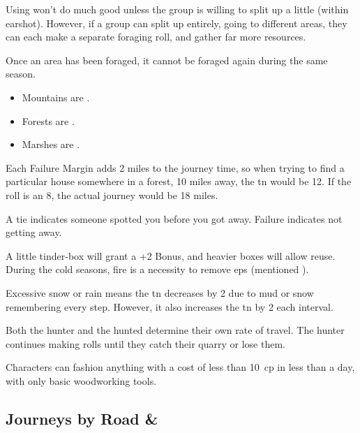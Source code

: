 \begin{multicols}{2}
Using  won't do much good unless the group is willing to split up a little (within earshot).
However, if a group can split up entirely, going to different areas, they can each make a separate foraging roll, and gather far more resources.

Once an area has been foraged, it cannot be foraged again during the same season.


\begin{itemize}
  \item
    Mountains are \tn[8].
  \item
    Forests are \tn[11].
  \item
    Marshes are \tn[12].
\end{itemize}

\noindent
Each Failure Margin adds 2 miles to the journey time, so when trying to find a particular house somewhere in a forest, 10 miles away, the \gls{tn} would be 12.
If the roll is an 8, the actual journey would be 18 miles.

A tie indicates someone spotted you before you got away.
Failure indicates not getting away.

A little tinder-box will grant a +2 Bonus, and heavier boxes will allow reuse.
During the cold seasons, fire is a necessity to remove \glspl{ep} (mentioned ).

Excessive snow or rain means the \gls{tn} decreases by 2 due to mud or snow remembering every step.
However, it also increases the \gls{tn} by 2 each \gls{interval}.

Both the hunter and the hunted determine their own rate of travel.
The hunter continues making rolls until they catch their quarry or lose them.

Characters can fashion anything with a cost of less than 10~\gls{cp} in less than a day, with only basic woodworking tools.

\subsection{Journeys by Road \& }


\end{multicols}
